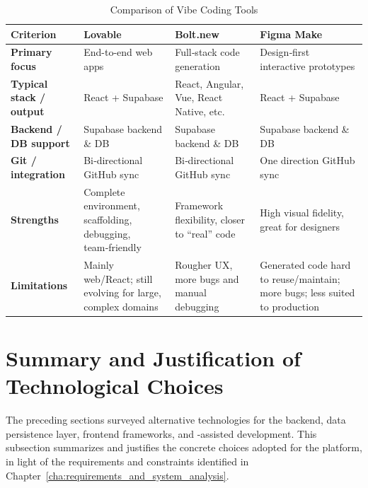             \begin{table}[H]
                \centering
                \renewcommand{\arraystretch}{1.5} 
                \begin{tabularx}{\textwidth}{|l|>{\raggedright\arraybackslash}X|>{\raggedright\arraybackslash}X|>{\raggedright\arraybackslash}X|}
                    \hline
                    \textbf{Criterion} & \textbf{Lovable} & \textbf{Bolt.new} & \textbf{Figma Make} \\ \hline
                    \textbf{Primary focus} & End-to-end web apps & Full‑stack code generation & Design‑first interactive prototypes \\ \hline
                    \textbf{Typical stack / output} & React + Supabase & React, Angular, Vue, React Native, etc. & React + Supabase \\ \hline
                    \textbf{Backend / DB support} & Supabase backend \& DB & Supabase backend \& DB & Supabase backend \& DB \\ \hline
                    \textbf{Git / integration} & Bi‑directional GitHub sync & Bi‑directional GitHub sync & One direction GitHub sync \\ \hline
                    \textbf{Strengths} & Complete environment, scaffolding, debugging, team‑friendly & Framework flexibility, closer to “real” code & High visual fidelity, great for designers \\ \hline
                    \textbf{Limitations} & Mainly web/React; still evolving for large, complex domains & Rougher UX, more bugs and manual debugging & Generated code hard to reuse/maintain; more bugs; less suited to production
                    \\ \hline
                \end{tabularx}
                \caption{Comparison of Vibe Coding Tools}
                \label{tab:vibe_coding_tools__comparison}
            \end{table}

        

\section{Summary and Justification of Technological Choices}
    {
        The preceding sections surveyed alternative technologies for the backend, data persistence layer, frontend frameworks, and -assisted development.
        This subsection summarizes and justifies the concrete choices adopted for the platform, in light of the requirements and constraints identified in Chapter~\ref{cha:requirements_and_system_analysis}.
    }

